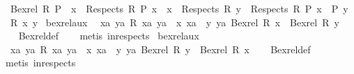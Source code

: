\begin{isabellebody}
\isanewline
\ \ {\isachardoublequoteopen}Bex{}{\isacharunderscore}{\kern0pt}rel\ R\ P\ {\isasymlongleftrightarrow}\ {\isacharparenleft}{\kern0pt}{\isasymexists}x\ {\isasymin}\ Respects\ R{\isachardot}{\kern0pt}\ P\ x{\isacharparenright}{\kern0pt}\ {\isasymand}\ {\isacharparenleft}{\kern0pt}{\isasymforall}x\ {\isasymin}\ Respects\ R{\isachardot}{\kern0pt}\ {\isasymforall}y\ {\isasymin}\ Respects\ R{\isachardot}{\kern0pt}\ {\isacharparenleft}{\kern0pt}{\isacharparenleft}{\kern0pt}P\ x\ {\isasymand}\ P\ y{\isacharparenright}{\kern0pt}\ {\isasymlongrightarrow}\ {\isacharparenleft}{\kern0pt}R\ x\ y{\isacharparenright}{\kern0pt}{\isacharparenright}{\kern0pt}{\isacharparenright}{\kern0pt}{\isachardoublequoteclose}\isanewline
\isanewline
{}\isamarkupfalse%
\ bex{}{\isacharunderscore}{\kern0pt}rel{\isacharunderscore}{\kern0pt}aux{\isacharcolon}{\kern0pt}\isanewline
\ \ {\isachardoublequoteopen}{\isasymlbrakk}{\isasymforall}xa\ ya{\isachardot}{\kern0pt}\ R\ xa\ ya\ {\isasymlongrightarrow}\ x\ xa\ {\isacharequal}{\kern0pt}\ y\ ya{\isacharsemicolon}{\kern0pt}\ Bex{}{\isacharunderscore}{\kern0pt}rel\ R\ x{\isasymrbrakk}\ {\isasymLongrightarrow}\ Bex{}{\isacharunderscore}{\kern0pt}rel\ R\ y{\isachardoublequoteclose}\isanewline
%
\isadelimproof
\ \ %
\endisadelimproof
%
\isatagproof
{}\isamarkupfalse%
\ Bex{}{\isacharunderscore}{\kern0pt}rel{\isacharunderscore}{\kern0pt}def\isanewline
\ \ \isamarkupfalse%
\ {\isacharparenleft}{\kern0pt}metis\ in{\isacharunderscore}{\kern0pt}respects{\isacharparenright}{\kern0pt}%
\endisatagproof
{\isafoldproof}%
%
\isadelimproof
\isanewline
%
\endisadelimproof
\isanewline
{}\isamarkupfalse%
\ bex{}{\isacharunderscore}{\kern0pt}rel{\isacharunderscore}{\kern0pt}aux{}{\isacharcolon}{\kern0pt}\isanewline
\ \ {\isachardoublequoteopen}{\isasymlbrakk}{\isasymforall}xa\ ya{\isachardot}{\kern0pt}\ R\ xa\ ya\ {\isasymlongrightarrow}\ x\ xa\ {\isacharequal}{\kern0pt}\ y\ ya{\isacharsemicolon}{\kern0pt}\ Bex{}{\isacharunderscore}{\kern0pt}rel\ R\ y{\isasymrbrakk}\ {\isasymLongrightarrow}\ Bex{}{\isacharunderscore}{\kern0pt}rel\ R\ x{\isachardoublequoteclose}\isanewline
%
\isadelimproof
\ \ %
\endisadelimproof
%
\isatagproof
{}\isamarkupfalse%
\ Bex{}{\isacharunderscore}{\kern0pt}rel{\isacharunderscore}{\kern0pt}def\isanewline
\ \ \isamarkupfalse%
\ {\isacharparenleft}{\kern0pt}metis\ in{\isacharunderscore}{\kern0pt}respects{\isacharparenright}{\kern0pt}%

\end{isabellebody}
